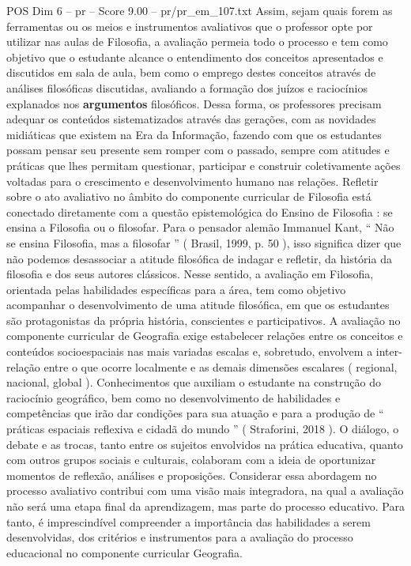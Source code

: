 \begin{textsample}{POS Dim 6 – pr – Score 9.00 – pr/pr\_em\_107.txt}
Assim, sejam quais forem as ferramentas ou os meios e instrumentos avaliativos que o professor opte por utilizar nas aulas de Filosofia, a avaliação permeia todo o processo e tem como objetivo que o estudante alcance o entendimento dos conceitos apresentados e discutidos em sala de aula, bem como o emprego destes conceitos através de análises filosóficas discutidas, avaliando a formação dos juízos e raciocínios explanados nos \textbf{argumentos} filosóficos.
Dessa forma, os professores precisam adequar os conteúdos sistematizados através das gerações, com as novidades midiáticas que existem na Era da Informação, fazendo com que os estudantes possam pensar seu presente sem romper com o passado, sempre com atitudes e práticas que lhes permitam questionar, participar e construir coletivamente ações voltadas para o crescimento e desenvolvimento humano nas relações.
Refletir sobre o ato avaliativo no âmbito do componente curricular de Filosofia está conectado diretamente com a questão epistemológica do Ensino de Filosofia : se ensina a Filosofia ou o filosofar.
Para o pensador alemão Immanuel Kant, “ Não se ensina Filosofia, mas a filosofar ” ( Brasil, 1999, p. 50 ), isso significa dizer que não podemos desassociar a atitude filosófica de indagar e refletir, da história da filosofia e dos seus autores clássicos.
Nesse sentido, a avaliação em Filosofia, orientada pelas habilidades específicas para a área, tem como objetivo acompanhar o desenvolvimento de uma atitude filosófica, em que os estudantes são protagonistas da própria história, conscientes e participativos.
A avaliação no componente curricular de Geografia exige estabelecer relações entre os conceitos e conteúdos socioespaciais nas mais variadas escalas e, sobretudo, envolvem a inter-relação entre o que ocorre localmente e as demais dimensões escalares ( regional, nacional, global ).
Conhecimentos que auxiliam o estudante na construção do raciocínio geográfico, bem como no desenvolvimento de habilidades e competências que irão dar condições para sua atuação e para a produção de “ práticas espaciais reflexiva e cidadã do mundo ” ( Straforini, 2018 ).
O diálogo, o debate e as trocas, tanto entre os sujeitos envolvidos na prática educativa, quanto com outros grupos sociais e culturais, colaboram com a ideia de oportunizar momentos de reflexão, análises e proposições.
Considerar essa abordagem no processo avaliativo contribui com uma visão mais integradora, na qual a avaliação não será uma etapa final da aprendizagem, mas parte do processo educativo.
Para tanto, é imprescindível compreender a importância das habilidades a serem desenvolvidas, dos critérios e instrumentos para a avaliação do processo educacional no componente curricular Geografia.

\end{textsample}
